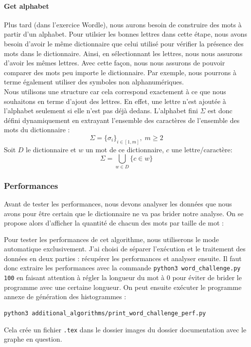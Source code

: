 \documentclass[10pt,a4paper,hidelinks]{article}
\begin{document}
\paragraph{Get alphabet}
Plus tard (dans l'exercice Wordle), nous aurons besoin de construire des mots à partir d'un alphabet. Pour utilsier les bonnes lettres dans cette étape, nous avons besoin d'avoir le même dictionnaire que celui utilisé pour vérifier la présence des mots dans le dictionnaire. Ainsi, en sélectionnant les lettres, nous nous assurons d'avoir les mêmes lettres. Avec cette façon, nous nous assurons de pouvoir comparer des mots peu importe le dictionnaire. Par exemple, nous pourrons à terme également utiliser des symboles non alphanumériques.\\

Nous utilisons une structure  car cela correspond exactement à ce que nous souhaitons en terme d'ajout des lettres. En effet, une lettre n'est ajoutée à l'alphabet seulement si elle n'est pas déjà dedans.\label{set}
L'alphabet fini $\Sigma$ est donc défini dynamiquement en extrayant l'ensemble des caractères de l'ensemble des mots du dictionnaire :
$$\Sigma = \{\sigma_i\}_{i\in[1, m]},\; m\geqslant 2$$
Soit $D$ le dictionnaire et $w$ un mot de ce dictionnaire, $c$ une lettre/caractère:
$$\Sigma = \bigcup_{w\in D}\{c\in w\}$$

\subsubsection{Performances}
Avant de tester les performances, nous devons analyser les données que nous avons pour être certain que le dictionnaire ne va pas brider notre analyse. On se propose alors d'afficher la quantité de chacun des mots par taille de mot :


Pour tester les performances de cet algorithme, nous utiliserons le mode automatique exclusivement. J'ai choisi de séparer l'exécution et le traitement des données en deux parties : récupérer les performances et analyser ensuite. Il faut donc extraire les performances avec la commande \verb|python3 word_challenge.py 100| en faisant attention à régler la longueur du mot à $0$ pour éviter de brider le programme avec une certaine longueur.
On peut ensuite exécuter le programme annexe de génération des histogrammes :
\begin{lstlisting}
python3 additional_algorithms/print_word_challenge_perf.py
\end{lstlisting}
Cela crée un fichier \verb|.tex| dans le dossier images du dossier documentation avec le graphe en question.
\end{document}
